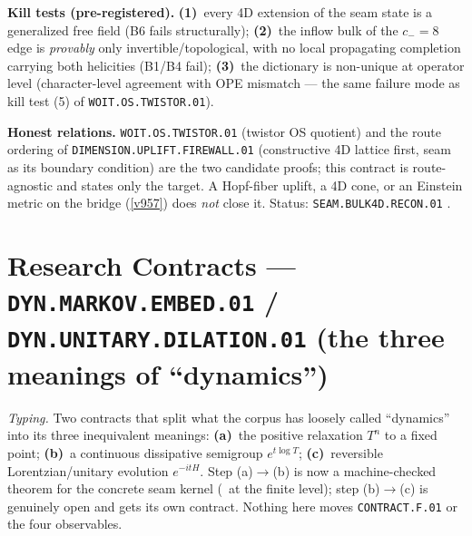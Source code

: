 \documentclass[11pt,a4paper]{article}
\begin{document}
\par\smallskip\noindent\textbf{Kill tests (pre-registered).}
\textbf{(1)}~every 4D extension of the seam state is a generalized free field (B6 fails
structurally); \textbf{(2)}~the inflow bulk of the $c_-{=}8$ edge is \emph{provably} only
invertible/topological, with no local propagating completion carrying both helicities (B1/B4
fail); \textbf{(3)}~the dictionary is non-unique at operator level (character-level agreement
with OPE mismatch --- the same failure mode as kill test (5) of \texttt{WOIT.OS.TWISTOR.01}).

\par\smallskip\noindent\textbf{Honest relations.} \texttt{WOIT.OS.TWISTOR.01} (twistor OS
quotient) and the route ordering of \texttt{DIMENSION.UPLIFT.FIREWALL.01} (constructive 4D
lattice first, seam as its boundary condition) are the two candidate proofs; this contract is
route-agnostic and states only the target.  A Hopf-fiber uplift, a 4D cone, or an Einstein
metric on the bridge (\vref{v957}) does \emph{not} close it.  Status:
\texttt{SEAM.BULK4D.RECON.01} \mO.

\section*{Research Contracts --- \texttt{DYN.MARKOV.EMBED.01} / \texttt{DYN.UNITARY.DILATION.01} (the three meanings of ``dynamics'')}
\noindent\emph{Typing.} Two contracts that split what the corpus has loosely called ``dynamics''
into its three inequivalent meanings: \textbf{(a)}~the positive relaxation $T^n$ to a fixed
point; \textbf{(b)}~a continuous dissipative semigroup $e^{t\log T}$; \textbf{(c)}~reversible
Lorentzian/unitary evolution $e^{-itH}$.  Step (a)$\to$(b) is now a machine-checked theorem for
the concrete seam kernel (\mE\ at the finite level); step (b)$\to$(c) is genuinely open and gets
its own contract.  Nothing here moves \texttt{CONTRACT.F.01} or the four observables.
\end{document}
